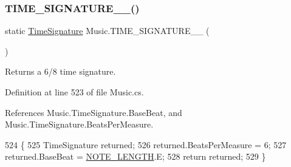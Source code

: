 \subsubsection{\texorpdfstring{T\+I\+M\+E\+\_\+\+S\+I\+G\+N\+A\+T\+U\+R\+E\+\_\+\_()}{TIME\_SIGNATURE\_6\_8()}}
{\footnotesize\ttfamily static \hyperlink{group___music_structs_struct_music_1_1_time_signature}{Time\+Signature} Music.\+T\+I\+M\+E\+\_\+\+S\+I\+G\+N\+A\+T\+U\+R\+E\+\_\+\_ (\begin{DoxyParamCaption}{ }\end{DoxyParamCaption})\hspace{0.3cm}{\ttfamily [static]}}



Returns a 6/8 time signature. 



Definition at line 523 of file Music.\+cs.



References Music.\+Time\+Signature.\+Base\+Beat, and Music.\+Time\+Signature.\+Beats\+Per\+Measure.


\begin{DoxyCode}
524     \{
525         TimeSignature returned;
526         returned.BeatsPerMeasure = 6;
527         returned.BaseBeat = \hyperlink{group___music_enums_gaf11b5f079adbb21c800b9eca1c5c3cbd}{NOTE\_LENGTH}.E;
528         \textcolor{keywordflow}{return} returned;
529     \}
\end{DoxyCode}
